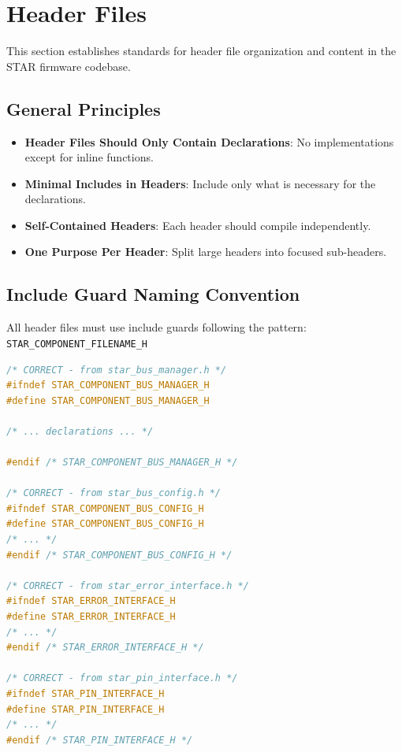 \section{Header Files}

This section establishes standards for header file organization and content in the STAR firmware codebase.

\subsection{General Principles}

\begin{itemize}
    \item \textbf{Header Files Should Only Contain Declarations}: No implementations except for inline functions.
    \item \textbf{Minimal Includes in Headers}: Include only what is necessary for the declarations.
    \item \textbf{Self-Contained Headers}: Each header should compile independently.
    \item \textbf{One Purpose Per Header}: Split large headers into focused sub-headers.
\end{itemize}

\subsection{Include Guard Naming Convention}

All header files must use include guards following the pattern: \texttt{STAR\_COMPONENT\_FILENAME\_H}

\begin{lstlisting}[language=C]
/* CORRECT - from star_bus_manager.h */
#ifndef STAR_COMPONENT_BUS_MANAGER_H
#define STAR_COMPONENT_BUS_MANAGER_H

/* ... declarations ... */

#endif /* STAR_COMPONENT_BUS_MANAGER_H */

/* CORRECT - from star_bus_config.h */
#ifndef STAR_COMPONENT_BUS_CONFIG_H
#define STAR_COMPONENT_BUS_CONFIG_H
/* ... */
#endif /* STAR_COMPONENT_BUS_CONFIG_H */

/* CORRECT - from star_error_interface.h */
#ifndef STAR_ERROR_INTERFACE_H
#define STAR_ERROR_INTERFACE_H
/* ... */
#endif /* STAR_ERROR_INTERFACE_H */

/* CORRECT - from star_pin_interface.h */
#ifndef STAR_PIN_INTERFACE_H
#define STAR_PIN_INTERFACE_H
/* ... */
#endif /* STAR_PIN_INTERFACE_H */
\end{lstlisting}

